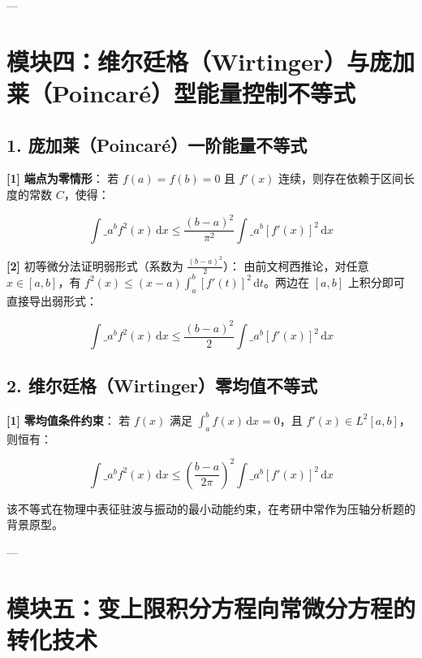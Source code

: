 \documentclass[11pt,a4paper,UTF8]{ctexart}
\begin{document}
---


\section{模块四：维尔廷格（Wirtinger）与庞加莱（Poincaré）型能量控制不等式}


\subsection{1. 庞加莱（Poincaré）一阶能量不等式}
\begin{solbox}[分步推导与答题规范]
\textbf{[1]}  \textbf{端点为零情形}：
若 $f(a) = f(b) = 0$ 且 $f'(x)$ 连续，则存在依赖于区间长度的常数 $C$，使得：

\begin{equation*}
\int\_a^b f^2(x)\,\mathrm{d}x \le \frac{(b-a)^2}{\pi^2}\int\_a^b [f'(x)]^2\,\mathrm{d}x
\end{equation*}


\textbf{[2]}  \textit{}初等微分法证明弱形式（系数为 $\frac{(b-a)^2}{2}$）\textit{}：
由前文柯西推论，对任意 $x \in [a, b]$，有 $f^2(x) \le (x-a)\int_a^b [f'(t)]^2\,\mathrm{d}t$。两边在 $[a, b]$ 上积分即可直接导出弱形式：

\begin{equation*}
\int\_a^b f^2(x)\,\mathrm{d}x \le \frac{(b-a)^2}{2}\int\_a^b [f'(x)]^2\,\mathrm{d}x
\end{equation*}

\end{solbox}


\subsection{2. 维尔廷格（Wirtinger）零均值不等式}
\begin{solbox}[分步推导与答题规范]
\textbf{[1]}  \textbf{零均值条件约束}：
若 $f(x)$ 满足 $\int_a^b f(x)\,\mathrm{d}x = 0$，且 $f'(x) \in L^2[a, b]$，则恒有：

\begin{equation*}
\int\_a^b f^2(x)\,\mathrm{d}x \le \left( \frac{b-a}{2\pi} \right)^2 \int\_a^b [f'(x)]^2\,\mathrm{d}x
\end{equation*}

该不等式在物理中表征驻波与振动的最小动能约束，在考研中常作为压轴分析题的背景原型。
\end{solbox}

---


\section{模块五：变上限积分方程向常微分方程的转化技术}
\end{document}

